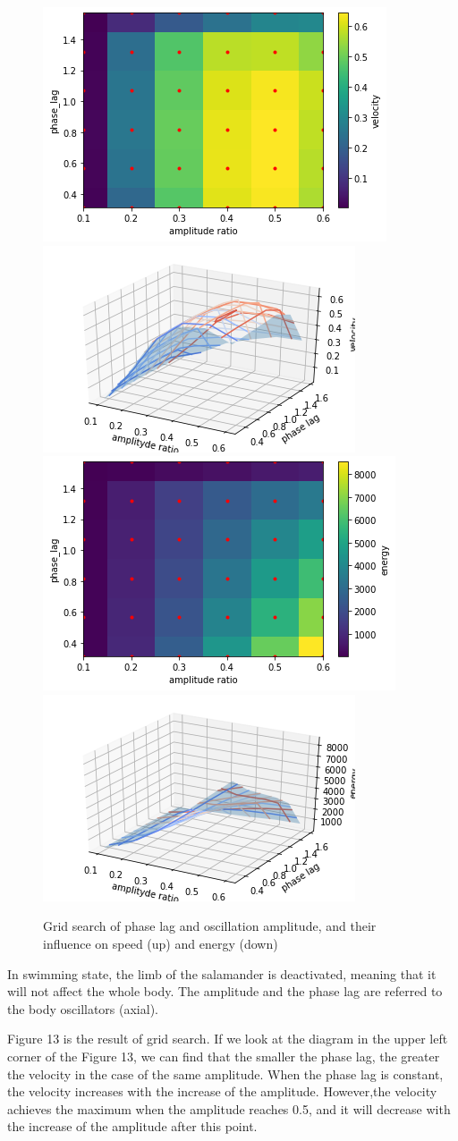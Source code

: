 \documentclass{cmc}
\begin{document}
\begin{figure}[H]
\centering
\includegraphics[height=0.3\columnwidth]{figures/8b_v1.png}
\includegraphics[height=0.3\columnwidth]{figures/8b_v2.png}
\includegraphics[height=0.3\columnwidth]{figures/8b_e1.png}
\includegraphics[height=0.3\columnwidth]{figures/8b_e2.png}
\caption{Grid search of phase lag and oscillation amplitude, and their influence on speed (up) and energy (down)}
\label{b}
\end{figure}

In swimming state, the limb of the salamander is deactivated, meaning that it will not affect the whole body. The amplitude and the phase lag are referred to the body oscillators (axial).

Figure 13 is the result of grid search. If we look at the diagram in the upper left corner of the Figure 13, we can find that the smaller the phase lag, the greater the velocity in the case of the same amplitude. When the phase lag is constant, the velocity increases with the increase of the amplitude. However,the velocity achieves the maximum when the amplitude reaches 0.5, and it will decrease with the increase of the amplitude after this point.
\end{document}
